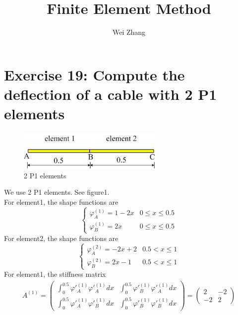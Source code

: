 \documentclass{article}
\begin{document}
\title{Finite Element Method}
\author{Wei Zhang}
\large
\maketitle

\section{Exercise 19: Compute the deflection of a cable with 2 P1 elements}

\begin{figure}[H]
\begin{center}
\includegraphics[width=7cm]{cable.jpg}    %
\caption{2 P1 elements}
\end{center}
\end{figure}

We use 2 P1 elements. See figure1.\\
 For element1, the shape functions are
\begin{equation}
\begin{cases}
\varphi_{A}^{(1)}=1-2x& \text{$\displaystyle 0 \leq x \leq 0.5$}\\
\varphi_{B}^{(1)}=2x& \text{$\displaystyle 0 \leq x \leq 0.5$}
\end{cases}
\end{equation}
 For element2, the shape functions are
\begin{equation}
\begin{cases}
\varphi_{A}^{(2)}=-2x+2& \text{$\displaystyle 0.5 < x \leq 1$}\\
\varphi_{B}^{(2)}=2x-1& \text{$\displaystyle 0.5 < x \leq 1$}
\end{cases}
\end{equation}
For element1, the stiffness matrix
\begin{gather*}
A^{(1)}=
\begin{pmatrix}
\int^{0.5}_{0}\varphi'^{(1)}_{A}\varphi'^{(1)}_{A}dx & \int^{0.5}_{0}\varphi'^{(1)}_{B}\varphi'^{(1)}_{A}dx\\
\int^{0.5}_{0}\varphi'^{(1)}_{A}\varphi'^{(1)}_{B}dx & \int^{0.5}_{0}\varphi'^{(1)}_{B}\varphi'^{(1)}_{B}dx
\end{pmatrix}=
\begin{pmatrix}
2 & -2\\
-2 & 2
\end{pmatrix}
\end{gather*}
\end{document}
